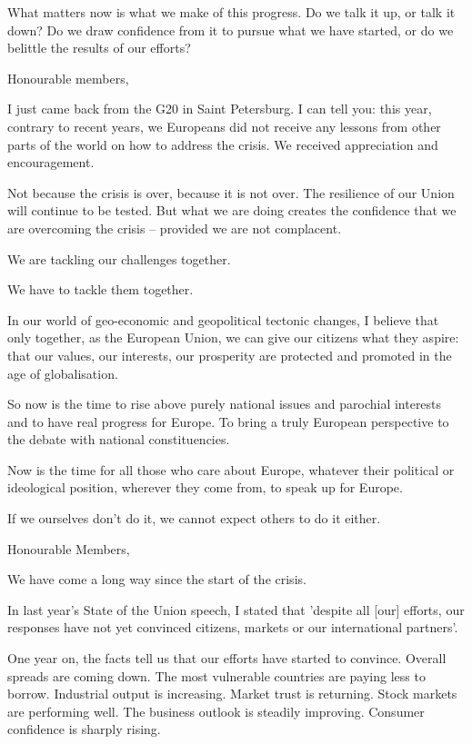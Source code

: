 \documentclass[a4paper,11pt]{article}
\begin{document}
What matters now is what we make of this progress. Do we talk it up, or talk it down? Do we draw confidence from it to pursue what we have started, or do we belittle the results of our efforts?

Honourable members,

I just came back from the G20 in Saint Petersburg. I can tell you: this year, contrary to recent years, we Europeans did not receive any lessons from other parts of the world on how to address the crisis. We received appreciation and encouragement.

Not because the crisis is over, because it is not over. The resilience of our Union will continue to be tested. But what we are doing creates the confidence that we are overcoming the crisis – provided we are not complacent.

We are tackling our challenges together.

We have to tackle them together.

In our world of geo-economic and geopolitical tectonic changes, I believe that only together, as the European Union, we can give our citizens what they aspire: that our values, our interests, our prosperity are protected and promoted in the age of globalisation.

So now is the time to rise above purely national issues and parochial interests and to have real progress for Europe. To bring a truly European perspective to the debate with national constituencies.

Now is the time for all those who care about Europe, whatever their political or ideological position, wherever they come from, to speak up for Europe.

If we ourselves don't do it, we cannot expect others to do it either.

Honourable Members,

We have come a long way since the start of the crisis.

In last year's State of the Union speech, I stated that 'despite all [our] efforts, our responses have not yet convinced citizens, markets or our international partners'.

One year on, the facts tell us that our efforts have started to convince. Overall spreads are coming down. The most vulnerable countries are paying less to borrow. Industrial output is increasing. Market trust is returning. Stock markets are performing well. The business outlook is steadily improving. Consumer confidence is sharply rising.
\end{document}
